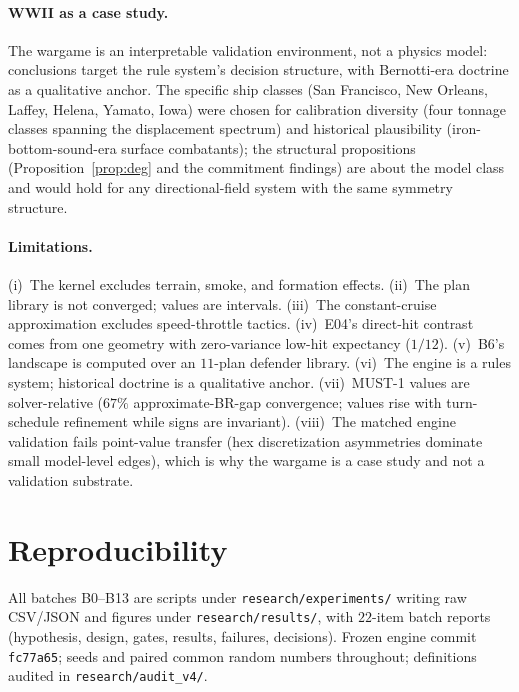 \documentclass[12pt,a4paper]{article}
\begin{document}
\paragraph{WWII as a case study.}  The wargame is an interpretable
validation environment, not a physics model: conclusions target the rule
system's decision structure, with Bernotti-era doctrine as a qualitative
anchor.  The specific ship classes (San Francisco, New Orleans, Laffey,
Helena, Yamato, Iowa) were chosen for calibration diversity (four tonnage
classes spanning the displacement spectrum) and historical plausibility
(iron-bottom-sound-era surface combatants); the structural propositions
(Proposition~\ref{prop:deg} and the commitment findings) are about the
model class and would hold for any directional-field system with the same
symmetry structure.

\paragraph{Limitations.}  (i)~The kernel excludes terrain, smoke, and
formation effects.  (ii)~The plan library is not converged; values are
intervals.  (iii)~The constant-cruise approximation excludes
speed-throttle tactics.  (iv)~E04's direct-hit contrast comes from one
geometry with zero-variance low-hit expectancy ($1/12$).  (v)~B6's
landscape is computed over an $11$-plan defender library.  (vi)~The
engine is a rules system; historical doctrine is a qualitative anchor.
(vii)~MUST-1 values are solver-relative ($67\%$ approximate-BR-gap
convergence; values rise with turn-schedule refinement while signs are
invariant).  (viii)~The matched engine validation fails point-value
transfer (hex discretization asymmetries dominate small model-level
edges), which is why the wargame is a case study and not a validation
substrate.

\section{Reproducibility}\label{sec:repro}
All batches B0--B13 are scripts under \texttt{research/experiments/}
writing raw CSV/JSON and figures under \texttt{research/results/}, with
$22$-item batch reports (hypothesis, design, gates, results, failures,
decisions).  Frozen engine commit \texttt{fc77a65}; seeds and paired
common random numbers throughout; definitions audited in
\texttt{research/audit\_v4/}.
\end{document}
